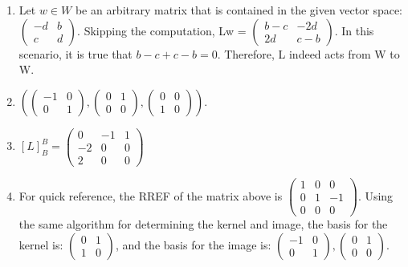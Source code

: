 \documentclass{article}
\begin{document}
\begin{enumerate}
\begin{enumerate}

\item Let $w \in W$ be an arbitrary matrix that is contained in the given vector space: $\left(\begin{array}{cc} -d & b \\ c & d \end{array}\right)$. Skipping the computation, Lw = $\left(\begin{array}{cc} b-c & -2d \\ 2d & c-b \end{array}\right)$. In this scenario, it is true that $b - c + c - b = 0$. Therefore, L indeed acts from W to W.

\item $\left(\left(\begin{array}{cc} -1 & 0 \\ 0 & 1 \end{array}\right), \left(\begin{array}{cc} 0 & 1 \\ 0 & 0 \end{array}\right), \left(\begin{array}{cc} 0 & 0 \\ 1 & 0 \end{array}\right)\right)$.

\item $[L]^B_B = \left(\begin{array}{ccc} 0 & -1 & 1 \\ -2 & 0 & 0 \\ 2 & 0 & 0 \end{array}\right)$

\item For quick reference, the RREF of the matrix above is $\left(\begin{array}{ccc} 1 & 0 & 0 \\ 0 & 1 & -1 \\ 0 & 0 & 0 \end{array}\right)$. Using the same algorithm for determining the kernel and image, the basis for the kernel is: $\left(\begin{array}{cc} 0 & 1 \\ 1 & 0 \end{array}\right)$, and the basis for the image is: $\left(\begin{array}{cc} -1 & 0 \\ 0 & 1 \end{array}\right), \left(\begin{array}{cc} 0 & 1 \\ 0 & 0 \end{array}\right)$.


\end{enumerate}
\end{enumerate}
\end{document}
